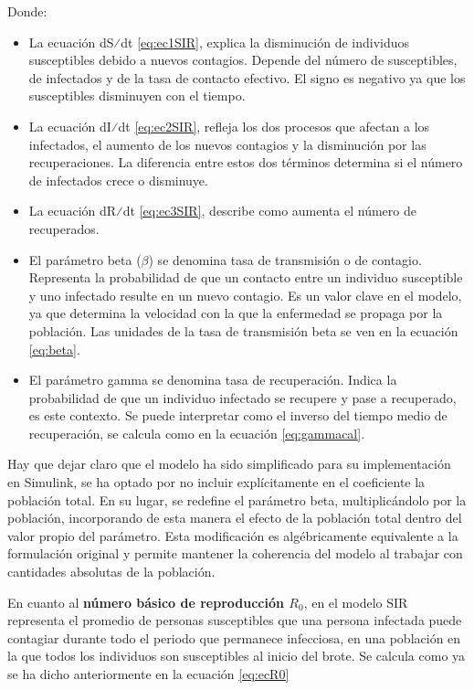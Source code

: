 Donde:
\begin{itemize}
    \item 	La ecuación dS⁄dt \eqref{eq:ec1SIR}, explica la disminución de individuos susceptibles debido a nuevos contagios. Depende del número de susceptibles, de infectados y de la tasa de contacto efectivo. El signo es negativo ya que los susceptibles disminuyen con el tiempo.
    \item 	La ecuación dI⁄dt \eqref{eq:ec2SIR}, refleja los dos procesos que afectan a los infectados, el aumento de los nuevos contagios y la disminución por las recuperaciones. La diferencia entre estos dos términos determina si el número de infectados crece o disminuye.
    \item 	La ecuación dR⁄dt \eqref{eq:ec3SIR}, describe como aumenta el número de recuperados. 
    \item El parámetro beta ($\beta$) se denomina tasa de transmisión o de contagio. Representa la probabilidad de que un contacto entre un individuo susceptible y uno infectado resulte en un nuevo contagio. Es un valor clave en el modelo, ya que determina la velocidad con la que la enfermedad se propaga por la población. Las unidades de la tasa de transmisión beta se ven en la ecuación \eqref{eq:beta}.
    \item 	El parámetro gamma se denomina tasa de recuperación. Indica la probabilidad de que un individuo infectado se recupere y pase a recuperado, es este contexto. Se puede interpretar como el inverso del tiempo medio de recuperación, se calcula como en la ecuación \eqref{eq:gammacal}.
\end{itemize}

Hay que dejar claro que el modelo ha sido simplificado para su implementación en Simulink, se ha optado por no incluir explícitamente en el coeficiente la población total. En su lugar, se redefine el parámetro beta, multiplicándolo por la población, incorporando de esta manera el efecto de la población total dentro del valor propio del parámetro. Esta modificación es algébricamente equivalente a la formulación original y permite mantener la coherencia del modelo al trabajar con cantidades absolutas de la población. 

En cuanto al \textbf{número básico de reproducción $R_0$}, en el modelo SIR representa el promedio de personas susceptibles que una persona infectada puede contagiar durante todo el periodo que permanece infecciosa, en una población en la que todos los individuos son susceptibles al inicio del brote. Se calcula como ya se ha dicho anteriormente en la ecuación \eqref{eq:ecR0}


